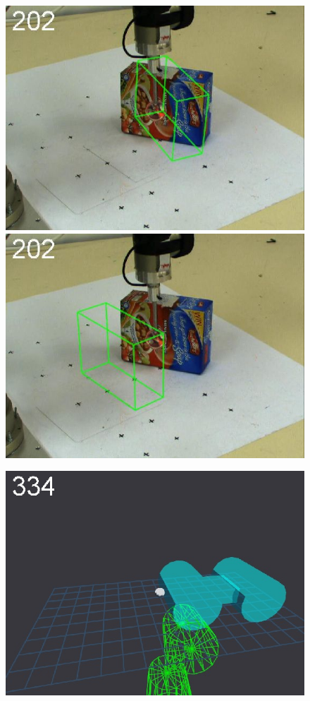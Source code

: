 \begin{figure}[t]
{\includegraphics[width=\imgCXwid]{./C1_2exp_87_4}
\includegraphics[width=\imgCXwid]{./C1_LWPR1_87_4}
}
\centerline{
\includegraphics[width=\imgCXwid]{./C5_1exp_6_5}
}
\end{figure}
